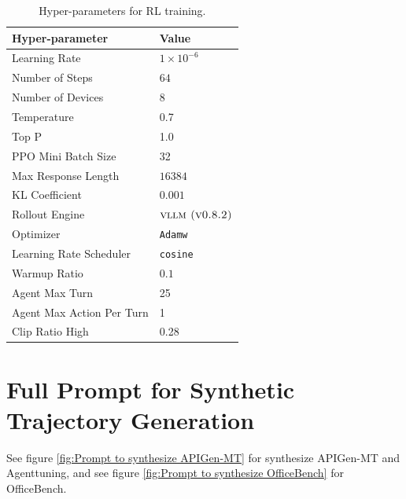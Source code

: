 \begin{table}[htbp]
\small
\centering
\caption{Hyper-parameters for RL training.}
\begin{tabular}{ll}
\toprule
\textbf{Hyper-parameter} & \textbf{Value} \\ \midrule
Learning Rate & $1 \times 10^{-6}$ \\
Number of Steps & $64$ \\
Number of Devices & $8$ \\
Temperature & 0.7 \\
Top P & 1.0 \\
PPO Mini Batch Size & 32 \\
Max Response Length & $16384$ \\
KL Coefficient & $0.001$ \\
Rollout Engine & $\textsc{vllm (v0.8.2)}$ \\
Optimizer & \texttt{Adamw} \\
Learning Rate Scheduler & \texttt{cosine} \\
Warmup Ratio & $0.1$ \\
Agent Max Turn & 25 \\
Agent Max Action Per Turn & 1 \\
Clip Ratio High & 0.28 \\

\bottomrule
\end{tabular}
\label{tab: rl hyperparameters}
\end{table}




\section{Full Prompt for Synthetic Trajectory Generation}
\label{appendix:prompt}

See figure \ref{fig:Prompt to synthesize APIGen-MT} for synthesize APIGen-MT and Agenttuning, and see figure \ref{fig:Prompt to synthesize OfficeBench} for OfficeBench.




